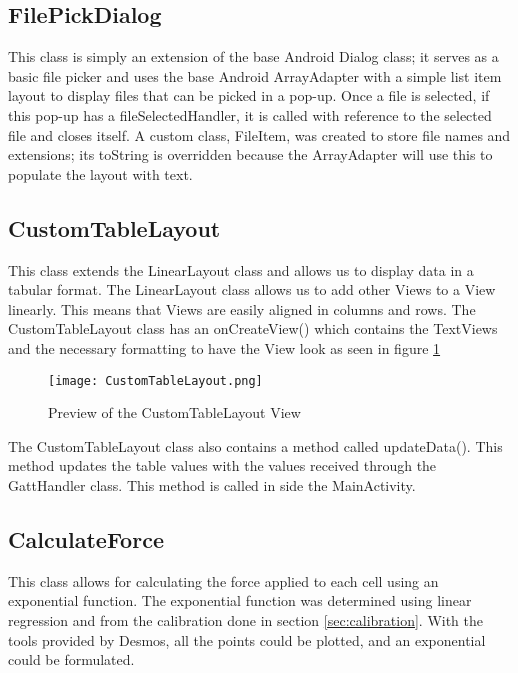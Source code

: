 \subsection{FilePickDialog}

This class is simply an extension of the base Android Dialog class; it serves as a basic file picker and uses the base Android ArrayAdapter with a simple list item layout to display files that can be picked in a pop-up. Once a file is selected, if this pop-up has a fileSelectedHandler, it is called with reference to the selected file and closes itself. A custom class, FileItem, was created to store file names and extensions; its toString is overridden because the ArrayAdapter will use this to populate the layout with text.
\clearpage
\subsection{CustomTableLayout}
This class extends the LinearLayout class and allows us to display data in a tabular format. The LinearLayout class allows us to add other Views to a View linearly. This means that Views are easily aligned in columns and rows. The CustomTableLayout class has an onCreateView() which contains the TextViews and the necessary formatting to have the View look as seen in figure \ref{fig:customtable}

\begin{figure}[!htb]
  \centering
  \texttt{[image: CustomTableLayout.png]}
  \caption{Preview of the CustomTableLayout View}
  \label{fig:customtable}
\end{figure}

The CustomTableLayout class also contains a method called updateData(). This method updates the table values with the values received through the GattHandler class. This method is called in side the MainActivity.
\clearpage
\subsection{CalculateForce}
This class allows for calculating the force applied to each cell using an exponential function. The exponential function was determined using linear regression and from the calibration done in section \ref{sec:calibration}. With the tools provided by Desmos\cite{desmos}, all the points could be plotted, and an exponential could be formulated.
 

